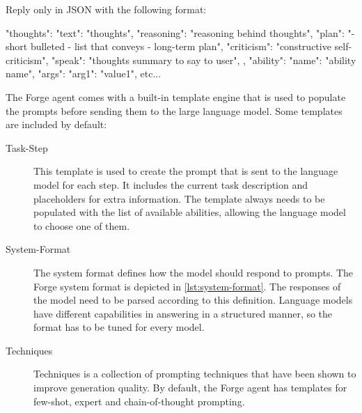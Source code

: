 \documentclass[../main.tex]{subfiles}
\begin{document}
\begin{Code}[
            caption={The system format of the Forge agent.
                        The language model is asked to only answer in this format.
                        The model generates thoughts before creating the output for the user (speak).
                        Thoughts include reasoning, a plan and criticism.
                        After the model generated the thoughts,
                        it generates an ability proposal with the corresponding arguments.},
            label={lst:system-format},
            captionpos=b,
            float=tp]
Reply only in JSON with the following format:

{
      "thoughts": {
            "text":  "thoughts",
            "reasoning": "reasoning behind thoughts",
            "plan": "- short bulleted
                     - list that conveys
                     - long-term plan",
            "criticism": "constructive self-criticism",
            "speak": "thoughts summary to say to user",
      },
      "ability": {
            "name": "ability name",
            "args": {
                  "arg1": "value1", etc...
            }
      }
}
\end{Code}

The Forge agent comes with a built-in template engine that is used
to populate the prompts before sending them to the large language model.
Some templates are included by default:

\begin{description}
      \item[Task-Step] This template is used to create the prompt that is sent to the language model for each step.
            It includes the current task description and placeholders for extra information.
            The template always needs to be populated with the list of available abilities,
            allowing the language model to choose one of them.
      \item[System-Format] The system format defines how the model should respond to prompts.
            The Forge system format is depicted in \autoref{lst:system-format}.
            The responses of the model need to be parsed according to this definition.
            Language models have different capabilities in answering in a structured manner, %
            so the format has to be tuned for every model.
      \item[Techniques] Techniques is a collection of prompting techniques that have been shown to improve generation quality.
            By default, the Forge agent has templates for few-shot, expert and chain-of-thought prompting. %
\end{description}
\end{document}
